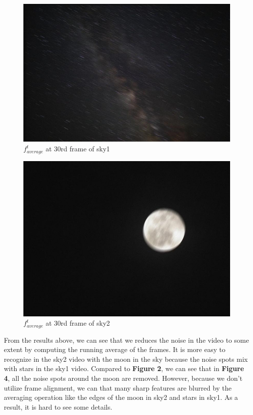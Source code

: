 \documentclass[
	12pt, %
]{fphw}
\begin{document}
\begin{figure}[H]
 
	\centering
	\includegraphics[width=1\columnwidth]{T1/result/sky1woalign_30.jpg} %
	\caption{$f^t_{average}$ at 30rd frame of sky\underline{\hspace{0.5em}}1}
	\label{fig3}
	 
\end{figure}

\begin{figure}[H]
 
	\centering
	\includegraphics[width=1\columnwidth]{T1/result/sky2woalign_30.jpg} %
	\caption{$f^t_{average}$ at 30rd frame of sky\underline{\hspace{0.5em}}2}
	\label{fig4}
	 
\end{figure}
From the results above, we can see that we reduces the noise in the video to some extent by computing the running average of the frames. It is more easy to recognize in the sky2 video with the moon in the sky because the noise spots mix with stars in the sky1 video. Compared to \textbf{Figure 2}, we can see that in \textbf{Figure 4}, all the noise spots around the moon are removed. However, because we don't utilize frame alignment, we can that many sharp features are blurred by the averaging operation like the edges of the moon in sky2 and stars in sky1. As a result, it is hard to see some details.
\end{document}
